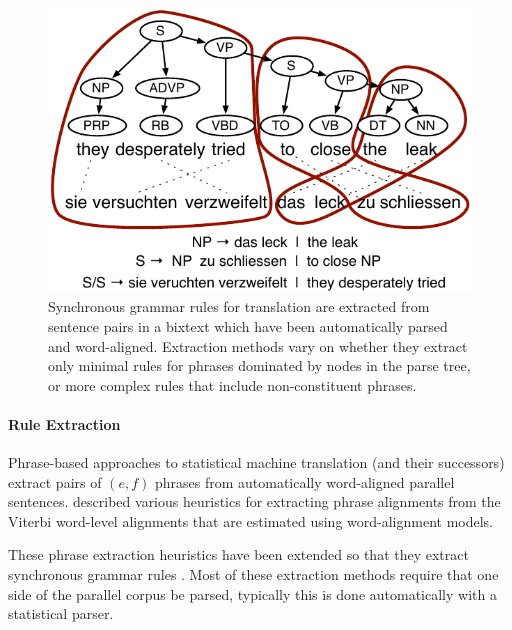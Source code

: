 \documentclass[11pt]{article}
\begin{document}
\begin{figure}[t]
\begin{center}
\includegraphics[width=0.99\linewidth]{figures/example_extraction-2.pdf}
\end{center}
\caption{Synchronous grammar rules for translation are extracted from
  sentence pairs in a bixtext which have been automatically parsed and
  word-aligned. Extraction methods vary on whether they extract only
  minimal rules for phrases dominated by nodes in the parse tree, or
  more complex rules that include non-constituent phrases.}
\label{example_extraction}
\end{figure}

\paragraph{Rule Extraction}

Phrase-based approaches to statistical machine translation (and their
successors) extract pairs of $(e, f)$ phrases from automatically
word-aligned parallel sentences. 
described various heuristics for extracting phrase alignments from the
Viterbi word-level alignments that are estimated using
 word-alignment models.

These phrase extraction heuristics have been extended so that they
extract synchronous grammar rules
\cite{Galley2004,Chiang2005,Zollmann2006,Liu2006}.  Most of these
extraction methods require that one side of the parallel corpus be
parsed, typically this is done automatically with a statistical
parser.
\end{document}
